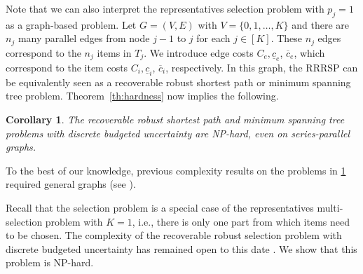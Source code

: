 \documentclass[a4paper,11pt,abstracton]{scrartcl}
\newtheorem{cor}{Corollary} %
\theoremstyle{definition}
\theoremstyle{remark}
\begin{document}
Note that we can also interpret the representatives selection problem with $p_j=1$ as a graph-based problem. Let $G=(V,E)$ with $V=\{0,1,\ldots,K\}$ and there are $n_j$ many parallel edges from node $j-1$ to $j$ for each $j\in[K]$. These $n_j$ edges correspond to the $n_j$ items in $T_j$. We introduce edge costs $C_e, \underline{c}_e$, $\overline{c}_e$, which correspond to the item costs $C_i, \underline{c}_i$, $\overline{c}_i$, respectively. In this graph, the RRRSP can be equivalently seen as a recoverable robust shortest path or minimum spanning tree problem. Theorem~\ref{th:hardness} now implies the following.

\begin{cor}
\label{corollary:shortest-path-st-hard}
The recoverable robust shortest path and minimum spanning tree problems with discrete budgeted uncertainty are NP-hard, even on series-parallel graphs.
\end{cor}

To the best of our knowledge, previous complexity results on the problems in \cref{corollary:shortest-path-st-hard} required general graphs (see \cite{busing2012paths,nasrabadi2013robust}).

Recall that the selection problem is a special case of the representatives multi-selection problem with $K=1$, i.e., there is only one part from which items need to be chosen. The complexity of the recoverable robust selection problem with discrete budgeted uncertainty has remained open to this date \cite{chassein2018recoverable}. We show that this problem is NP-hard.
\end{document}
